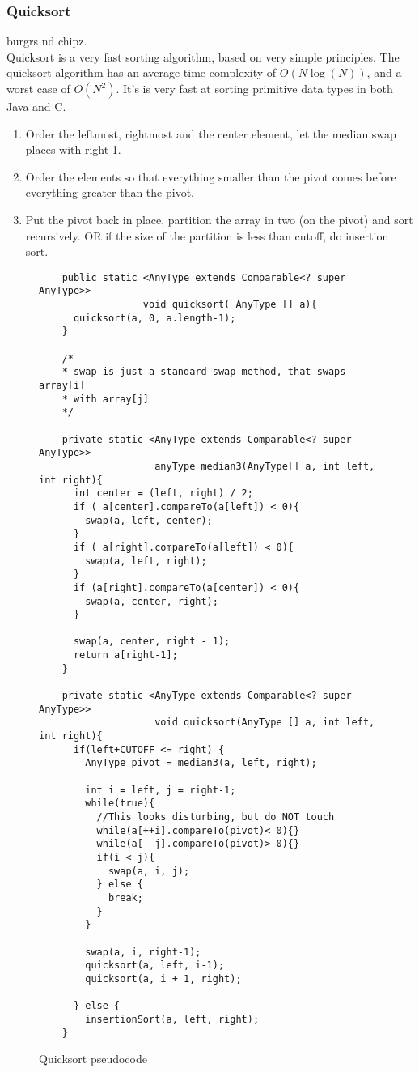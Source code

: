 \documentclass[paper=a4, fontsize=11pt]{scrartcl}
\numberwithin{equation}{section} %
\numberwithin{figure}{section} %
\numberwithin{table}{section} %
\theoremstyle{definition}
\begin{document}
\subsubsection{Quicksort}
burgrs nd chipz.\\
Quicksort is a very fast sorting algorithm, based on very simple principles. The quicksort algorithm has an average time complexity of \(O(N\log(N))\), and a worst case of \(O(N^2)\). It's is very fast at sorting primitive data types in both Java and C.

\begin{enumerate}
  \item  Order the leftmost, rightmost and the center element, let the median swap places with right-1.
  \item  Order the elements so that everything smaller than the pivot comes before everything greater than the pivot.
  \item  Put the pivot back in place, partition the array in two (on the pivot) and sort recursively.
         OR if the size of the partition is less than cutoff,  do insertion sort.
\end{enumerate}

\begin{figure}[p]
  \begin{verbatim}
    public static <AnyType extends Comparable<? super AnyType>> 
                  void quicksort( AnyType [] a){
      quicksort(a, 0, a.length-1);
    }
                  
    /*
    * swap is just a standard swap-method, that swaps array[i] 
    * with array[j]
    */

    private static <AnyType extends Comparable<? super AnyType>> 
                    anyType median3(AnyType[] a, int left, int right){
      int center = (left, right) / 2;
      if ( a[center].compareTo(a[left]) < 0){
        swap(a, left, center);
      }
      if ( a[right].compareTo(a[left]) < 0){
        swap(a, left, right);
      }
      if (a[right].compareTo(a[center]) < 0){
        swap(a, center, right);
      }

      swap(a, center, right - 1);
      return a[right-1];
    }

    private static <AnyType extends Comparable<? super AnyType>> 
                    void quicksort(AnyType [] a, int left, int right){
      if(left+CUTOFF <= right) {
        AnyType pivot = median3(a, left, right);
        
        int i = left, j = right-1;
        while(true){
          //This looks disturbing, but do NOT touch
          while(a[++i].compareTo(pivot)< 0){}
          while(a[--j].compareTo(pivot)> 0){}
          if(i < j){
            swap(a, i, j);
          } else {
            break;
          }
        }
        
        swap(a, i, right-1);
        quicksort(a, left, i-1);
        quicksort(a, i + 1, right);
        
      } else {
        insertionSort(a, left, right);
    }
  \end{verbatim}
  \caption{Quicksort pseudocode}
\end{figure}
\end{document}
